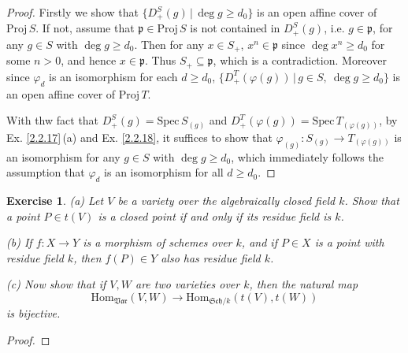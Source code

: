 \documentclass[12pt]{amsart}
\newtheorem{exe}{Exercise}[subsection]
\begin{document}
\begin{proof}
   Firstly we show that $\{D^S_+(g)\,|\,\deg g\geq d_0\}$ is an open affine cover of $\mathrm{Proj}\,S$. If not, assume that $\mathfrak{p}\in\mathrm{Proj}\,S$ is not contained in $D^S_+(g)$, i.e. $g\in\mathfrak{p}$, for any $g\in S$ with $\deg g\geq d_0$. Then for any $x\in S_+$, $x^n\in\mathfrak{p}$ since $\deg x^n\geq d_0$ for some $n>0$, and hence $x\in\mathfrak{p}$. Thus $S_+\subseteq\mathfrak{p}$, which is a contradiction. Moreover since $\varphi_d$ is an isomorphism for each $d\geq d_0$, $\{D^T_+(\varphi(g))\,|\,g\in S,\ \deg g\geq d_0\}$ is an open affine cover of $\mathrm{Proj}\,T$.
   
   With thw fact that $D^S_+(g)=\mathrm{Spec}\,S_{(g)}$ and $D^T_+(\varphi(g))=\mathrm{Spec}\,T_{(\varphi(g))}$, by Ex. \ref{2.2.17}\,(a) and Ex. \ref{2.2.18}, it suffices to show that $\varphi_{(g)}:S_{(g)}\to T_{(\varphi(g))}$ is an isomorphism for any $g\in S$ with $\deg g\geq d_0$, which immediately follows the assumption that $\varphi_d$ is an isomorphism for all $d\geq d_0$.
\end{proof}

\begin{exe}
   (a) Let $V$ be a variety over the algebraically closed field $k$. Show that a point $P \in t(V)$ is a closed point if and only if its residue field is $k$.
   
   (b) If $f : X \to Y$ is a morphism of schemes over $k$, and if $P \in X$ is a point with residue field $k$, then $f(P) \in Y$ also has residue field $k$.
   
   (c) Now show that if $V,W$ are two varieties over $k$, then the natural map $$\mathrm{Hom}_{\mathfrak{Var}}(V,W) \to \mathrm{Hom}_{\mathfrak{Sch}/k}(t(V),t(W))$$is bijective.
\end{exe}

\begin{proof}
   
\end{proof}
\end{document}
